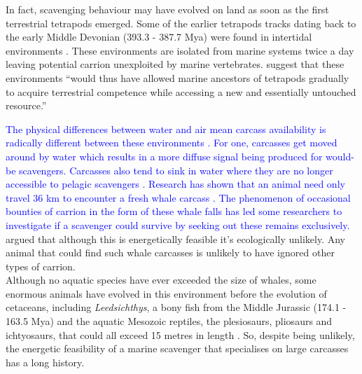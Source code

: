 \documentclass[a4paper,12pt]{article}
\begin{document}
In fact, scavenging behaviour may have evolved on land as soon as the first terrestrial tetrapods emerged.
Some of the earlier tetrapods tracks dating back to the early Middle Devonian (393.3 - 387.7 Mya) were found in intertidal environments \citep{Niedzwiedzki2009}.
These environments are isolated from marine systems twice a day leaving potential carrion unexploited by marine vertebrates.
\cite{Niedzwiedzki2009} suggest that these environments ``would thus have allowed marine ancestors of tetrapods gradually to acquire terrestrial competence while accessing a new and essentially untouched resource.''

\textcolor{blue}{The physical differences between water and air mean carcass availability is radically different between these environments \citep{beasley2012carrion}. 
For one, carcasses get moved around by water which results in a more diffuse signal being produced for would-be scavengers.
Carcasses also tend to sink in water where they are no longer accessible to pelagic scavengers \citep{beasley2012carrion}. 
\textcolor{blue}{Research has shown that an animal need only travel 36 km to encounter a fresh whale carcass \citep{smith2003ecology}.} 
The phenomenon of occasional bounties of carrion in the form of these whale falls has led some researchers to investigate if a scavenger could survive by seeking out these remains exclusively.}
\cite{ruxton2005searching} argued that although this is energetically feasible it's ecologically unlikely.
Any animal that could find such whale carcasses is unlikely to have ignored other types of carrion. \\
Although no aquatic species have ever exceeded the size of whales, some enormous animals have evolved in this environment before the evolution of cetaceans, including \textit{Leedsichthys}, a bony fish from the Middle Jurassic (174.1 - 163.5 Mya) and the aquatic Mesozoic reptiles, the plesiosaurs, pliosaurs and ichtyosaurs, that could all exceed 15 metres in length \citep{ruxton2011zoology,danise2014ecological}.
So, despite being unlikely, the energetic feasibility of a marine scavenger that specialises on large carcasses has a long history.

\end{document}
